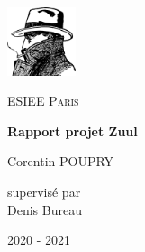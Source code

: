 {\centering
\includegraphics[width=0.15\textwidth]{./media/murphy.png}\\

\vspace{1cm}

{\scshape\LARGE ESIEE Paris \\}

\vspace{2.5cm}

{\huge\bfseries Rapport projet Zuul\\}

\vspace{2cm}

{\Large Corentin POUPRY\\}

\vfill

supervisé par\\
Denis Bureau

\vfill
	
{\large 2020 - 2021\\}
}

